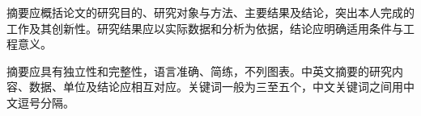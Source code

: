\begin{cnabstract}
摘要应概括论文的研究目的、研究对象与方法、主要结果及结论，突出本人完成的工作及其创新性。研究结果应以实际数据和分析为依据，结论应明确适用条件与工程意义。

摘要应具有独立性和完整性，语言准确、简练，不列图表。中英文摘要的研究内容、数据、单位及结论应相互对应。关键词一般为三至五个，中文关键词之间用中文逗号分隔。
\end{cnabstract}
